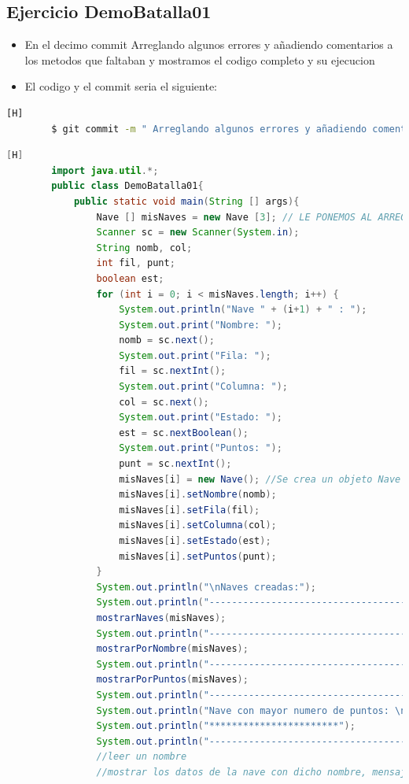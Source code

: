 \documentclass{article}
\begin{document}
	\subsection{Ejercicio DemoBatalla01}
	\begin{itemize}	
		\item En el decimo commit  Arreglando algunos errores y añadiendo comentarios a los metodos que faltaban y mostramos el codigo completo y su ejecucion
		\item El codigo y el commit seria el siguiente:
	\end{itemize}
	\begin{lstlisting}[language=bash,caption={Commit}][H]
		$ git commit -m " Arreglando algunos errores y añadiendo comentarios a los metodos que faltaban"
	\end{lstlisting}
	\begin{lstlisting}[language=java,caption={Las lineas de codigo de lo creado:}][H]
		import java.util.*;
		public class DemoBatalla01{
			public static void main(String [] args){
				Nave [] misNaves = new Nave [3]; // LE PONEMOS AL ARREGLO UN TAMAÑO DE 2 PARA SU POSTERIOR PRUEBA 
				Scanner sc = new Scanner(System.in);
				String nomb, col;
				int fil, punt;
				boolean est;
				for (int i = 0; i < misNaves.length; i++) {
					System.out.println("Nave " + (i+1) + " : ");
					System.out.print("Nombre: ");
					nomb = sc.next();
					System.out.print("Fila: ");
					fil = sc.nextInt();
					System.out.print("Columna: ");
					col = sc.next();
					System.out.print("Estado: ");
					est = sc.nextBoolean();
					System.out.print("Puntos: ");
					punt = sc.nextInt();
					misNaves[i] = new Nave(); //Se crea un objeto Nave y se asigna su referencia a misNaves
					misNaves[i].setNombre(nomb);
					misNaves[i].setFila(fil);
					misNaves[i].setColumna(col);
					misNaves[i].setEstado(est);
					misNaves[i].setPuntos(punt);
				}
				System.out.println("\nNaves creadas:");
				System.out.println("--------------------------------------");
				mostrarNaves(misNaves);
				System.out.println("--------------------------------------");
				mostrarPorNombre(misNaves);
				System.out.println("--------------------------------------");        
				mostrarPorPuntos(misNaves);
				System.out.println("--------------------------------------");
				System.out.println("Nave con mayor numero de puntos: \n" + mostrarMayorPuntos(misNaves));
				System.out.println("***********************");
				System.out.println("--------------------------------------");
				//leer un nombre
				//mostrar los datos de la nave con dicho nombre, mensaje de “no encontrado” en caso contrario

\end{lstlisting}
\end{document}
